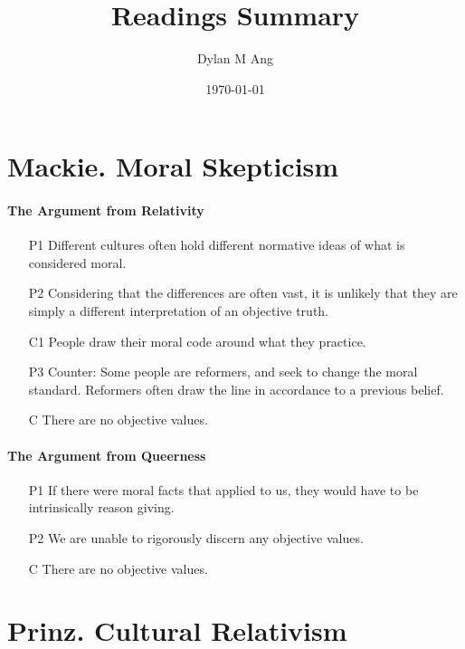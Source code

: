 \documentclass[12pt]{article}
\title{Readings Summary}
\author{Dylan M Ang}
\date{\today}
\begin{document}
\maketitle

\tableofcontents

\section{Mackie. Moral Skepticism}

\paragraph{The Argument from Relativity}
\begin{itemize}
    \item [P1] Different cultures often hold different normative ideas of what is considered moral.
    \item [P2] Considering that the differences are often vast, it is unlikely that they are simply a different interpretation of an objective truth.
    \item [C1] People draw their moral code around what they practice.
    \item [P3] Counter: Some people are reformers, and seek to change the moral standard. Reformers often draw the line in accordance to a previous belief.
    \item [C] There are no objective values.
\end{itemize}

\paragraph{The Argument from Queerness}
\begin{itemize}
    \item [P1] If there were moral facts that applied to us, they would have to be intrinsically reason giving.
    \item [P2] We are unable to rigorously discern any objective values.
    \item [C] There are no objective values.
\end{itemize}

\section{Prinz. Cultural Relativism}
\end{document}
